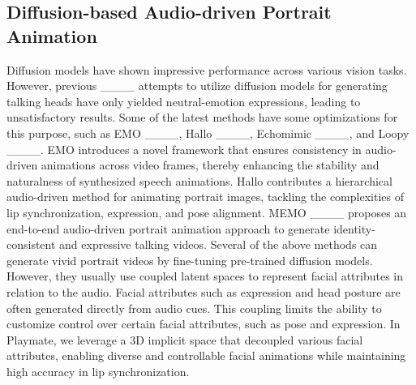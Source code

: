 \subsection{Diffusion-based Audio-driven Portrait Animation}
Diffusion models have shown impressive performance across various vision tasks. However, previous ____ attempts to utilize diffusion models for generating talking heads have only yielded neutral-emotion expressions, leading to unsatisfactory results. Some of the latest methods have some optimizations for this purpose, such as EMO ____, Hallo ____, Echomimic ____, and Loopy ____. EMO introduces a novel framework that ensures consistency in audio-driven animations across video frames, thereby enhancing the stability and naturalness of synthesized speech animations. Hallo contributes a hierarchical audio-driven method for animating portrait images, tackling the complexities of lip synchronization, expression, and pose alignment. MEMO ____ proposes an end-to-end audio-driven portrait animation approach to generate identity-consistent and expressive talking videos. Several of the above methods can generate vivid portrait videos by fine-tuning pre-trained diffusion models. However, they usually use coupled latent spaces to represent facial attributes in relation to the audio. Facial attributes such as expression and head posture are often generated directly from audio cues. This coupling limits the ability to customize control over certain facial attributes, such as pose and expression. In Playmate, we leverage a 3D implicit space that decoupled various facial attributes, enabling diverse and controllable facial animations while maintaining high accuracy in lip synchronization. 


